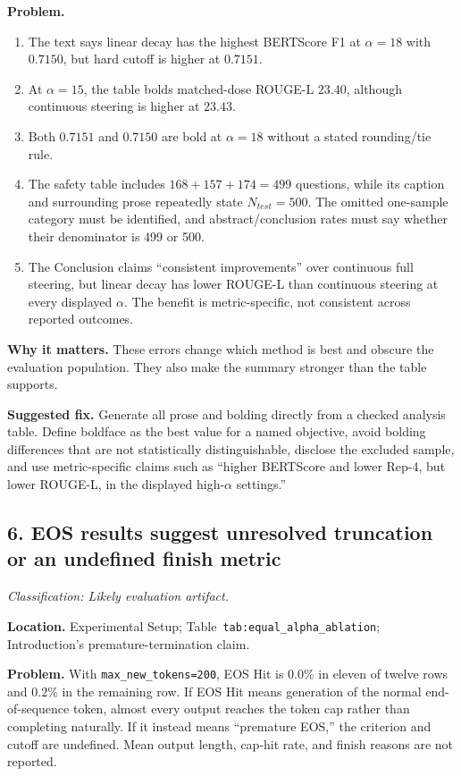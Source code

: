 \documentclass[11pt]{article}
\newcommand{\findinglabel}[1]{\textbf{#1}}
\newcommand{\classification}[1]{\textit{Classification: #1.}}
\begin{document}
\findinglabel{Problem.}
\begin{enumerate}
    \item The text says linear decay has the highest BERTScore F1 at $\alpha=18$ with $0.7150$, but hard cutoff is higher at $0.7151$.
    \item At $\alpha=15$, the table bolds matched-dose ROUGE-L $23.40$, although continuous steering is higher at $23.43$.
    \item Both $0.7151$ and $0.7150$ are bold at $\alpha=18$ without a stated rounding/tie rule.
    \item The safety table includes $168+157+174=499$ questions, while its caption and surrounding prose repeatedly state $N_{test}=500$.  The omitted one-sample category must be identified, and abstract/conclusion rates must say whether their denominator is 499 or 500.
    \item The Conclusion claims ``consistent improvements'' over continuous full steering, but linear decay has lower ROUGE-L than continuous steering at every displayed $\alpha$.  The benefit is metric-specific, not consistent across reported outcomes.
\end{enumerate}

\findinglabel{Why it matters.} These errors change which method is best and obscure the evaluation population.  They also make the summary stronger than the table supports.

\findinglabel{Suggested fix.} Generate all prose and bolding directly from a checked analysis table.  Define boldface as the best value for a named objective, avoid bolding differences that are not statistically distinguishable, disclose the excluded sample, and use metric-specific claims such as ``higher BERTScore and lower Rep-4, but lower ROUGE-L, in the displayed high-$\alpha$ settings.''

\subsection*{6. EOS results suggest unresolved truncation or an undefined finish metric}

\classification{Likely evaluation artifact}

\findinglabel{Location.} Experimental Setup; Table~\texttt{tab:equal\_alpha\_ablation}; Introduction's premature-termination claim.

\findinglabel{Problem.} With \texttt{max\_new\_tokens=200}, EOS Hit is $0.0\%$ in eleven of twelve rows and $0.2\%$ in the remaining row.  If EOS Hit means generation of the normal end-of-sequence token, almost every output reaches the token cap rather than completing naturally.  If it instead means ``premature EOS,'' the criterion and cutoff are undefined.  Mean output length, cap-hit rate, and finish reasons are not reported.
\end{document}

